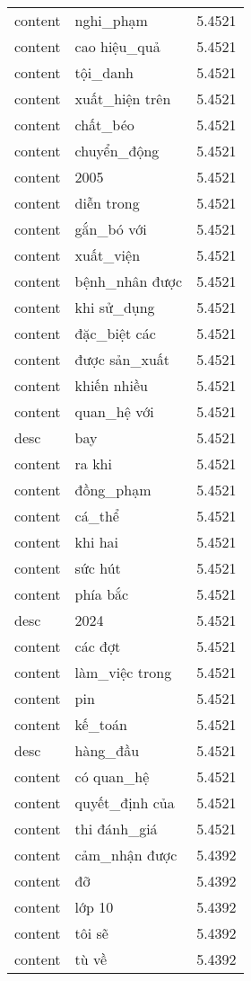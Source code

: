 \documentclass{article}
\begin{document}
\begin{tabular}{lll}
content & nghi\_phạm & 5.4521\\
content & cao hiệu\_quả & 5.4521\\
content & tội\_danh & 5.4521\\
content & xuất\_hiện trên & 5.4521\\
content & chất\_béo & 5.4521\\
content & chuyển\_động & 5.4521\\
content & 2005 & 5.4521\\
content & diễn trong & 5.4521\\
content & gắn\_bó với & 5.4521\\
content & xuất\_viện & 5.4521\\
content & bệnh\_nhân được & 5.4521\\
content & khi sử\_dụng & 5.4521\\
content & đặc\_biệt các & 5.4521\\
content & được sản\_xuất & 5.4521\\
content & khiến nhiều & 5.4521\\
content & quan\_hệ với & 5.4521\\
desc & bay & 5.4521\\
content & ra khi & 5.4521\\
content & đồng\_phạm & 5.4521\\
content & cá\_thể & 5.4521\\
content & khi hai & 5.4521\\
content & sức hút & 5.4521\\
content & phía bắc & 5.4521\\
desc & 2024 & 5.4521\\
content & các đợt & 5.4521\\
content & làm\_việc trong & 5.4521\\
content & pin & 5.4521\\
content & kế\_toán & 5.4521\\
desc & hàng\_đầu & 5.4521\\
content & có quan\_hệ & 5.4521\\
content & quyết\_định của & 5.4521\\
content & thi đánh\_giá & 5.4521\\
content & cảm\_nhận được & 5.4392\\
content & đỡ & 5.4392\\
content & lớp 10 & 5.4392\\
content & tôi sẽ & 5.4392\\
content & tù về & 5.4392\\

\end{tabular}
\end{document}
